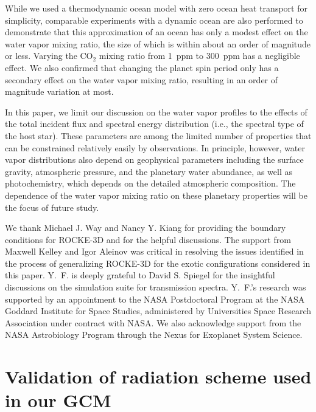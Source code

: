 \documentclass[11pt,numberedappendix,twocolappendix,]{emulateapj}
\def\modelE{ROCKE-3D}
\def\wv{water vapor}
\begin{document}
While we used a thermodynamic ocean model with zero ocean heat transport for simplicity, comparable experiments with a dynamic ocean are also performed to demonstrate that this approximation of an ocean has only a modest effect on the \wv{} mixing ratio, the size of which is within about an order of magnitude or less. 
Varying the CO$_2$ mixing ratio from 1~ppm to 300~ppm has a negligible effect. 
We also confirmed that changing the planet spin period only has a secondary effect on the \wv{} mixing ratio, resulting in an order of magnitude variation at most. 

In this paper, we limit our discussion on the \wv{} profiles to the effects of the total incident flux and spectral energy distribution (i.e., the spectral type of the host star). 
These parameters are among the limited number of properties that can be constrained relatively easily by observations. 
In principle, however, \wv{} distributions also depend on geophysical parameters including the surface gravity, atmospheric pressure, and the planetary water abundance, as well as photochemistry, which depends on the detailed atmospheric composition. 
The dependence of the \wv{} mixing ratio on these planetary properties will be  the focus of future study. 



\acknowledgments
We thank Michael J. Way and Nancy Y. Kiang for providing the boundary conditions for \modelE{} and for the helpful discussions. 
The support from Maxwell Kelley and Igor Aleinov was critical in resolving the issues identified in the process of generalizing \modelE{} for the exotic configurations considered in this paper. 
Y.~F. is deeply grateful to David S. Spiegel for the insightful discussions on the simulation suite for transmission spectra. 
Y.~F.'s research was supported by an appointment to the NASA Postdoctoral Program at the NASA Goddard Institute for Space Studies, administered by Universities Space Research Association under contract with NASA. 
We also acknowledge support from the NASA Astrobiology Program through the Nexus for Exoplanet System Science.




\appendix


\section{Validation of radiation scheme used in our GCM}
\label{ap:radiation}
\end{document}
